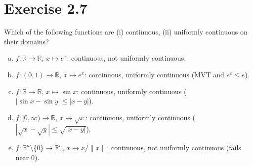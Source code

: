\documentclass[11pt,a4paper]{article}
\begin{document}
\section*{Exercise 2.7}
Which of the following functions are (i) continuous, (ii) uniformly continuous on their domains?
\begin{enumerate}[a)]
\item $f:\mathbb{R}\to\mathbb{R}$, $x\mapsto e^x$: continuous, not uniformly continuous.
\item $f:(0,1)\to\mathbb{R}$, $x\mapsto e^x$: continuous, uniformly continuous (MVT and $e^c\le e$).
\item $f:\mathbb{R}\to\mathbb{R}$, $x\mapsto\sin x$: continuous, uniformly continuous ($|\sin x-\sin y|\le |x-y|$).
\item $f:[0,\infty)\to\mathbb{R}$, $x\mapsto \sqrt{x}$: continuous, uniformly continuous ($|\sqrt{x}-\sqrt{y}|\le \sqrt{|x-y|}$).
\item[\textit{*}f)] $f:\mathbb{R}^n\setminus\{0\}\to\mathbb{R}^n$, $x\mapsto x/\|x\|$: continuous, not uniformly continuous (fails near $0$).
\end{enumerate}
\end{document}
